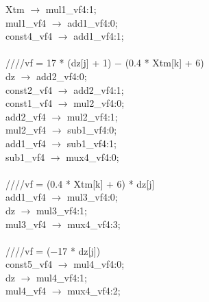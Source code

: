 {\hspace*{2em}Xtm $\rightarrow$ mul1\_vf4:1; \\
\hspace*{2em}mul1\_vf4 $\rightarrow$ add1\_vf4:0; \\
\hspace*{2em}const4\_vf4 $\rightarrow$ add1\_vf4:1; \\
   \\
   \hspace*{2em}////vf = 17 * (dz[j] + 1) $-$ (0.4 * Xtm[k] + 6) \\
   \hspace*{2em}dz $\rightarrow$ add2\_vf4:0; \\
   \hspace*{2em}const2\_vf4 $\rightarrow$ add2\_vf4:1; \\
   \hspace*{2em}const1\_vf4 $\rightarrow$ mul2\_vf4:0; \\
   \hspace*{2em}add2\_vf4 $\rightarrow$ mul2\_vf4:1; \\
   \hspace*{2em}mul2\_vf4 $\rightarrow$ sub1\_vf4:0; \\
   \hspace*{2em}add1\_vf4 $\rightarrow$ sub1\_vf4:1; \\
   \hspace*{2em}sub1\_vf4 $\rightarrow$ mux4\_vf4:0; \\
   \\
   \hspace*{2em}////vf = (0.4 * Xtm[k] + 6) * dz[j] \\
   \hspace*{2em}add1\_vf4 $\rightarrow$ mul3\_vf4:0; \\
   \hspace*{2em}dz $\rightarrow$ mul3\_vf4:1; \\
   \hspace*{2em}mul3\_vf4 $\rightarrow$ mux4\_vf4:3; \\
   \\
   \hspace*{2em}////vf = ($-$17 * dz[j]) \\
   \hspace*{2em}const5\_vf4 $\rightarrow$ mul4\_vf4:0; \\
   \hspace*{2em}dz $\rightarrow$ mul4\_vf4:1; \\
   \hspace*{2em}mul4\_vf4 $\rightarrow$ mux4\_vf4:2; \\
}
